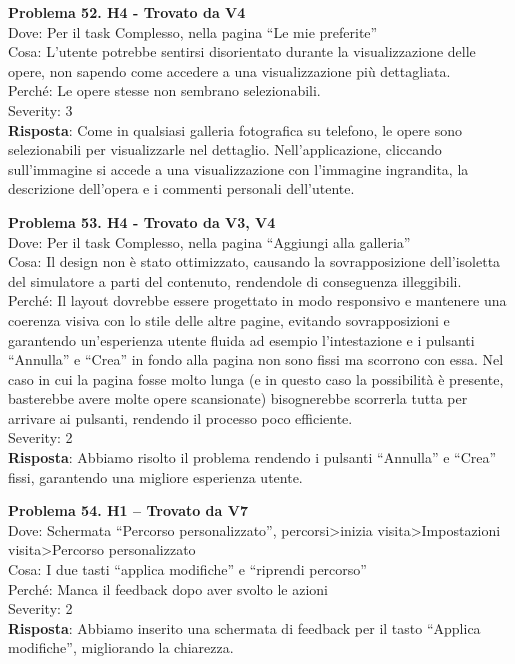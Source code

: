 \documentclass{article}
\begin{document}
\noindent \textbf{Problema 52. H4 - Trovato da V4} \\
Dove: Per il task Complesso, nella pagina “Le mie preferite” \\
Cosa: L'utente potrebbe sentirsi disorientato durante la visualizzazione delle opere, non sapendo come accedere a una visualizzazione più dettagliata. \\
Perché: Le opere stesse non sembrano selezionabili. \\
Severity: 3 \\
\textbf{Risposta}: Come in qualsiasi galleria fotografica su telefono, le opere sono selezionabili per visualizzarle nel dettaglio. Nell’applicazione, cliccando sull’immagine si accede a una visualizzazione con l’immagine ingrandita, la descrizione dell’opera e i commenti personali dell’utente.

\noindent \textbf{Problema 53. H4 - Trovato da V3, V4} \\
Dove: Per il task Complesso, nella pagina “Aggiungi alla galleria” \\
Cosa: Il design non è stato ottimizzato, causando la sovrapposizione dell'isoletta del simulatore a parti del contenuto, rendendole di conseguenza illeggibili. \\
Perché: Il layout dovrebbe essere progettato in modo responsivo e mantenere una coerenza visiva con lo stile delle altre pagine, evitando sovrapposizioni e garantendo un’esperienza utente fluida ad esempio l’intestazione e i pulsanti “Annulla” e “Crea” in fondo alla pagina non sono fissi ma scorrono con essa. Nel caso in cui la pagina fosse molto lunga (e in questo caso la possibilità è presente, basterebbe avere molte opere scansionate) bisognerebbe scorrerla tutta per arrivare ai pulsanti, rendendo il processo poco efficiente. \\
Severity: 2 \\
\textbf{Risposta}: Abbiamo risolto il problema rendendo i pulsanti “Annulla” e “Crea” fissi, garantendo una migliore esperienza utente.

\noindent \textbf{Problema 54. H1 – Trovato da V7} \\
Dove: Schermata “Percorso personalizzato”, percorsi>inizia visita>Impostazioni visita>Percorso personalizzato \\
Cosa: I due tasti “applica modifiche” e “riprendi percorso” \\
Perché: Manca il feedback dopo aver svolto le azioni \\
Severity: 2 \\
\textbf{Risposta}: Abbiamo inserito una schermata di feedback per il tasto “Applica modifiche”, migliorando la chiarezza.
\end{document}
